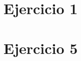 







\tableofcontents
\newpage


\section{Ejercicio 1}
	
	\newpage

\section{Ejercicio 5}
	
	\newpage
	
	\newpage
	
